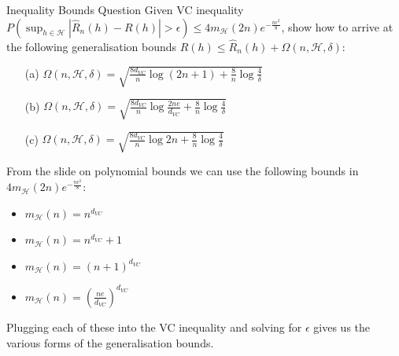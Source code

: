\begin{examplebox}{Inequality Bounds Question}
Given VC inequality \( P\left( \sup_{h\in\mathcal{H}} |\widehat{R}_n(h) - R(h)| > \epsilon \right) \leq 4m_{\mathcal{H}}(2n)e^{-\frac{n\epsilon^2}{8}} \), show how to arrive at the following generalisation bounds \( R(h) \leq \widehat{R}_n(h) + \Omega(n, \mathcal{H}, \delta) \):

\begin{itemize}
    \item[(a)] \(\Omega(n, \mathcal{H}, \delta) = \sqrt{\frac{8d_{VC}}{n} \log(2n + 1) + \frac{8}{n} \log \frac{4}{\delta}}\)
    \item[(b)] \(\Omega(n, \mathcal{H}, \delta) = \sqrt{\frac{8d_{VC}}{n} \log \frac{2ne}{d_{VC}} + \frac{8}{n} \log \frac{4}{\delta}}\)
    \item[(c)] \(\Omega(n, \mathcal{H}, \delta) = \sqrt{\frac{8d_{VC}}{n} \log 2n + \frac{8}{n} \log \frac{4}{\delta}}\)
\end{itemize}

From the slide on polynomial bounds we can use the following bounds in \( 4m_{\mathcal{H}}(2n)e^{-\frac{n\epsilon^2}{8}} \):
\begin{itemize}
    \item \( m_{\mathcal{H}}(n) = n^{d_{VC}} \)
    \item \( m_{\mathcal{H}}(n) = n^{d_{VC}} + 1 \)
    \item \( m_{\mathcal{H}}(n) = (n + 1)^{d_{VC}} \)
    \item \( m_{\mathcal{H}}(n) = \left(\frac{ne}{d_{VC}}\right)^{d_{VC}} \)
\end{itemize}

Plugging each of these into the VC inequality and solving for \( \epsilon \) gives us the various forms of the generalisation bounds.

\end{examplebox}

